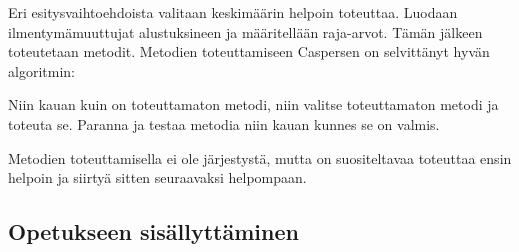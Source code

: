 Eri esitysvaihtoehdoista valitaan keskimäärin helpoin toteuttaa. Luodaan
ilmentymämuuttujat alustuksineen ja määritellään raja-arvot. Tämän jälkeen
toteutetaan metodit. Metodien toteuttamiseen Caspersen on selvittänyt hyvän
algoritmin:

Niin kauan kuin on toteuttamaton metodi, niin valitse toteuttamaton metodi ja
toteuta se. Paranna ja testaa metodia niin kauan kunnes se on valmis.

Metodien toteuttamisella ei ole järjestystä, mutta on suositeltavaa toteuttaa
ensin helpoin ja siirtyä sitten seuraavaksi helpompaan.

\subsection{Opetukseen sisällyttäminen}

